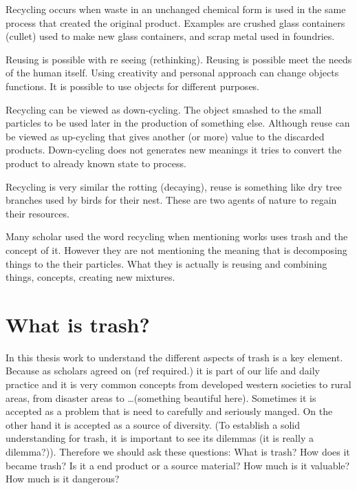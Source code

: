 Recycling occurs when waste in an unchanged chemical form is used in the same process that created the original product. Examples are crushed glass containers (cullet) used to make new glass containers, and scrap metal used in foundries. 

Reusing is possible with re seeing (rethinking). Reusing is possible meet the needs of the human itself. Using creativity and personal approach can change objects functions. It is possible to use objects for different purposes. 

Recycling can be viewed as down-cycling. The object smashed to the small particles to be used later in the production of something else. Although reuse can be viewed as up-cycling that gives another (or more) value to the discarded products. Down-cycling does not generates new meanings it tries to convert the product to already known state to process. 

Recycling is very similar the rotting (decaying), reuse is something like dry tree branches used by birds for their nest. These are two agents of nature to regain their resources.

Many scholar used the word recycling when mentioning works uses trash and the concept of it. However they are not mentioning the meaning that is decomposing things to the their particles. What they is actually is reusing and combining things, concepts, creating new mixtures.


\section{What is trash?}
In this thesis work to understand the different aspects of trash is a key element. Because as scholars agreed on (ref required.) it is part of our life and daily practice and it is very common concepts from developed western societies to rural areas, from disaster areas to \ldots(something beautiful here). Sometimes it is accepted as a problem that is need to carefully and seriously manged. On the other hand it is accepted as a source of diversity. (To establish a solid understanding for trash, it is important to see its dilemmas (it is really a dilemma?)). Therefore we should ask these questions: What is trash? How does it became trash? Is it a end product or a source material? How much is it valuable? How much is it dangerous?

